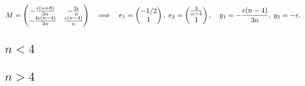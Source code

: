 \documentclass[11pt,letter, swedish, english
]{article}
\begin{document}
\begin{enumerate}[label=(\roman*)]
\[M=
\begin{pmatrix}
-\frac{\epsilon(n+8)}{3n} & -\frac{2\epsilon}{n} \\
-\frac{4\epsilon(n-4)}{3n} & \frac{\epsilon(n-4)}{n}
\end{pmatrix}
\quad\Longrightarrow\quad
e_1=\begin{pmatrix}
-1/2\\1
\end{pmatrix},\;
e_2=\begin{pmatrix}
\frac{3}{n-4}\\1
\end{pmatrix}\qcomma
y_1=-\frac{\epsilon(n-4)}{3n},\;y_2=-\epsilon.
\]%
\end{enumerate}

\subsection{$n<4$}

\begin{figure}
\centering

\caption{}
\label{fig:3i}
\end{figure}



\subsection{$n>4$}


\begin{figure}
\centering

\caption{}
\label{fig:3ii}
\end{figure}
\end{document}
